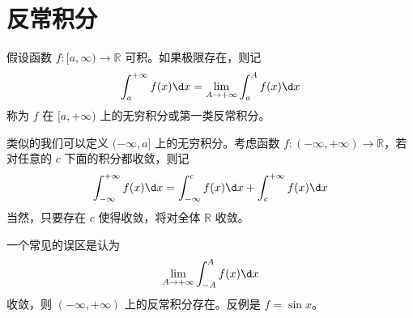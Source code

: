 \section{反常积分}

\begin{definition}
	假设函数 $f : [a, \infty) \to \mathbb{R}$ 可积。如果极限存在，则记
	\[ \int_{a}^{+\infty} f(x) \d x = \lim_{A \to +\infty} \int_{a}^{A} f(x) \d x \]
	称为 $f$ 在 $[a, +\infty)$ 上的无穷积分或第一类反常积分。
\end{definition}

类似的我们可以定义 $(-\infty, a]$ 上的无穷积分。考虑函数 $f : (-\infty, +\infty) \to \mathbb{R}$，若对任意的 $c$ 下面的积分都收敛，则记
\[ \int_{-\infty}^{+\infty} f(x) \d x = \int_{-\infty}^{c} f(x) \d x + \int_{c}^{+\infty}f(x) \d x \]
当然，只要存在 $c$ 使得收敛，将对全体 $\mathbb{R}$ 收敛。

一个常见的误区是认为
\[ \lim_{A \to +\infty} \int_{-A}^{A} f(x) \d x \]
收敛，则 $(-\infty, +\infty)$ 上的反常积分存在。反例是 $f = \sin x$。
